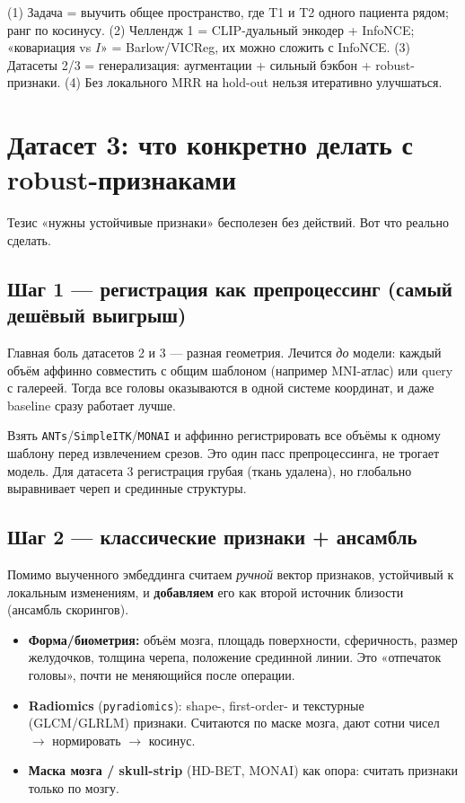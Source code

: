 \documentclass[11pt,a4paper]{article}
\begin{document}
\begin{compression}
(1) Задача = выучить общее пространство, где T1 и T2 одного пациента рядом; ранг по косинусу.
(2) Челлендж 1 = CLIP-дуальный энкодер + InfoNCE; «ковариация vs $I$» = Barlow/VICReg, их можно
сложить с InfoNCE. (3) Датасеты 2/3 = генерализация: аугментации + сильный бэкбон + robust-признаки.
(4) Без локального MRR на hold-out нельзя итеративно улучшаться.
\end{compression}

\clearpage
\section{Датасет 3: что конкретно делать с robust-признаками}

Тезис «нужны устойчивые признаки» бесполезен без действий. Вот что реально сделать.

\subsection{Шаг 1 — регистрация как препроцессинг (самый дешёвый выигрыш)}

Главная боль датасетов 2 и 3 — разная геометрия. Лечится \emph{до} модели: каждый объём
аффинно совместить с общим шаблоном (например MNI-атлас) или query с галереей. Тогда все головы
оказываются в одной системе координат, и даже baseline сразу работает лучше.

\begin{project}[Действие]
Взять \texttt{ANTs}/\texttt{SimpleITK}/\texttt{MONAI} и аффинно регистрировать все объёмы к
одному шаблону перед извлечением срезов. Это один пасс препроцессинга, не трогает модель.
Для датасета 3 регистрация грубая (ткань удалена), но глобально выравнивает череп и срединные структуры.
\end{project}

\subsection{Шаг 2 — классические признаки + ансамбль}

Помимо выученного эмбеддинга считаем \emph{ручной} вектор признаков, устойчивый к локальным
изменениям, и \textbf{добавляем} его как второй источник близости (ансамбль скорингов).

\begin{itemize}
\item \textbf{Форма/биометрия:} объём мозга, площадь поверхности, сферичность, размер желудочков,
толщина черепа, положение срединной линии. Это «отпечаток головы», почти не меняющийся после операции.
\item \textbf{Radiomics} (\texttt{pyradiomics}): shape-, first-order- и текстурные (GLCM/GLRLM)
признаки. Считаются по маске мозга, дают сотни чисел $\to$ нормировать $\to$ косинус.
\item \textbf{Маска мозга / skull-strip} (HD-BET, MONAI) как опора: считать признаки только по мозгу.
\end{itemize}
\end{document}
